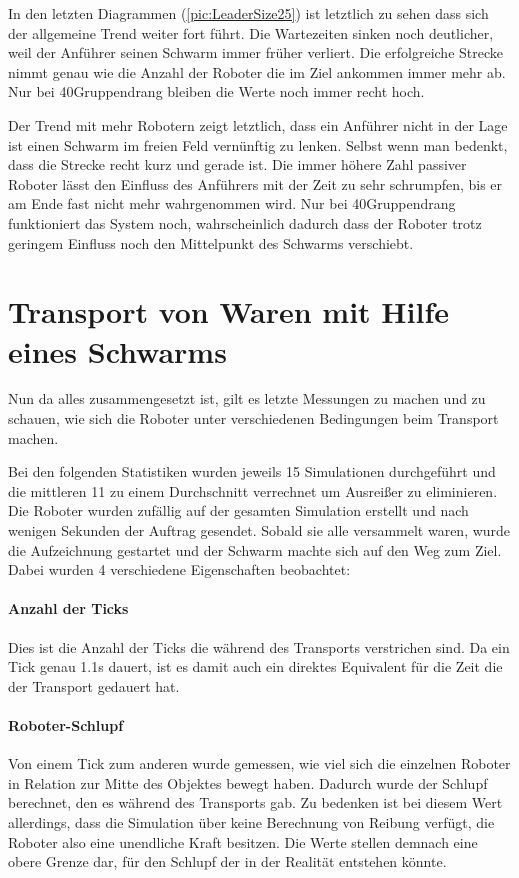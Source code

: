 In den letzten Diagrammen (\autoref{pic:LeaderSize25}) ist letztlich zu sehen dass sich der allgemeine Trend weiter fort führt. Die Wartezeiten sinken noch deutlicher, weil der Anführer seinen Schwarm immer früher verliert. Die erfolgreiche Strecke nimmt genau wie die Anzahl der Roboter die im Ziel ankommen immer mehr ab. Nur bei 40\per Gruppendrang bleiben die Werte noch immer recht hoch.

Der Trend mit mehr Robotern zeigt letztlich, dass ein Anführer nicht in der Lage ist einen Schwarm im freien Feld vernünftig zu lenken. Selbst wenn man bedenkt, dass die Strecke recht kurz und gerade ist. Die immer höhere Zahl passiver Roboter lässt den Einfluss des Anführers mit der Zeit zu sehr schrumpfen, bis er am Ende fast nicht mehr wahrgenommen wird. Nur bei 40\per Gruppendrang funktioniert das System noch, wahrscheinlich dadurch dass der Roboter trotz geringem Einfluss noch den Mittelpunkt des Schwarms verschiebt.









\section{Transport von Waren mit Hilfe eines Schwarms}

Nun da alles zusammengesetzt ist, gilt es letzte Messungen zu machen und zu schauen, wie sich die Roboter unter verschiedenen Bedingungen beim Transport machen.

Bei den folgenden Statistiken wurden jeweils 15 Simulationen durchgeführt und die mittleren 11 zu einem Durchschnitt verrechnet um Ausreißer zu eliminieren. Die Roboter wurden zufällig auf der gesamten Simulation erstellt und nach wenigen Sekunden der Auftrag gesendet. Sobald sie alle versammelt waren, wurde die Aufzeichnung gestartet und der Schwarm machte sich auf den Weg zum Ziel. Dabei wurden 4 verschiedene Eigenschaften beobachtet:

\paragraph*{Anzahl der Ticks}
Dies ist die Anzahl der Ticks die während des Transports verstrichen sind. Da ein Tick genau 1.1s dauert, ist es damit auch ein direktes Equivalent für die Zeit die der Transport gedauert hat.

\paragraph*{Roboter-Schlupf}
Von einem Tick zum anderen wurde gemessen, wie viel sich die einzelnen Roboter in Relation zur Mitte des Objektes bewegt haben. Dadurch wurde der Schlupf berechnet, den es während des Transports gab. Zu bedenken ist bei diesem Wert allerdings, dass die Simulation über keine Berechnung von Reibung verfügt, die Roboter also eine unendliche Kraft besitzen. Die Werte stellen demnach eine obere Grenze dar, für den Schlupf der in der Realität entstehen könnte.

